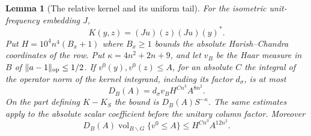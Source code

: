 \documentclass[a4paper,11pt]{article}
\newtheorem{lemma}[proposition]{Lemma}
\theoremstyle{definition}
\theoremstyle{remark}
\numberwithin{equation}{section}
\begin{document}
\begin{lemma}[The relative kernel and its uniform tail]
\leavevmode\label{lem:relkernel621}
For the isometric unit-frequency embedding \(J\),
\[
                  K(y,z)=(Ju)(z)(Ju)(y)^* .
\]
Put \(H=10^4 n^4(B_x+1)\) where \(B_x\ge1\) bounds the absolute
Harish--Chandra coordinates of the row. Put
\(\kappa=4n^2+2n+9\), and let \(v_B\) be the Haar measure in
\(B\) of \(\|a-1\|_{\rm op}\le1/2\).
If \(v^0(y),v^0(z)\le A\), for an absolute \(C\) the integral
of the operator norm of the kernel integrand, including its
factor \(d_\sigma\), is at most
\[
       D_B(A)=d_\sigma v_B H^{Cn^3} A^{8n^2}.
\]
On the part defining \(K-K_S\) the bound is
\(D_B(A) S^{-\kappa}\). The same estimates apply to the
absolute scalar coefficient before the unitary column factor.
Moreover
\[
    D_B(A)\operatorname{vol}_{B\backslash G}\{v^0\le A\}
                        \le H^{Cn^3}A^{12n^2}.
\]
\end{lemma}
\end{document}
